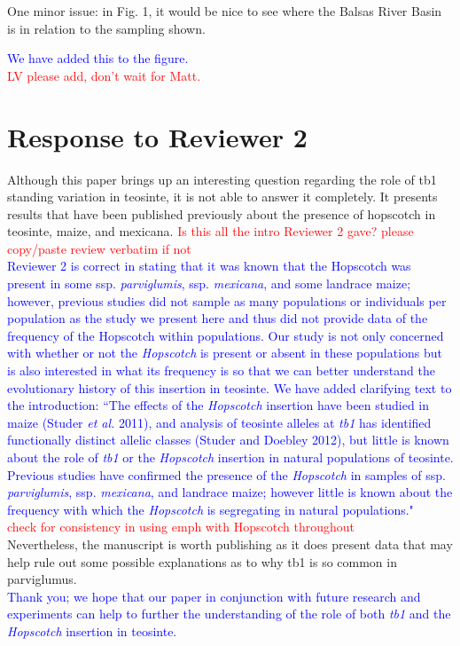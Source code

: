 \documentclass[11pt]{article}
\newcommand{\res}[1]{\noindent \textcolor{blue}{{#1}} \\}
\newcommand{\jri}[1]{\noindent \textcolor{red}{{#1}} \\}
\begin{document}
One minor issue: in Fig. 1, it would be nice to see where the Balsas River Basin is in relation to the sampling shown. 

\res{We have added this to the figure.} \jri{LV please add, don't wait for Matt.}

\section*{Response to Reviewer 2} 
Although this paper brings up an interesting question regarding the role of tb1 standing variation in teosinte, it is not able to answer it completely.  It presents results that have been published previously about the presence of hopscotch in teosinte, maize, and mexicana. \jri{Is this all the intro Reviewer 2 gave? please copy/paste review verbatim if not}

\res{Reviewer 2 is correct in stating that it was known that the Hopscotch was present in some ssp. \emph{parviglumis}, ssp. \emph{mexicana}, and some landrace maize; however, previous studies did not sample as many populations or individuals per population as the study we present here and thus did not provide data of the frequency of the Hopscotch within populations. Our study is not only concerned with whether or not the \emph{Hopscotch} is present or absent in these populations but is also interested in what its frequency is so that we can better understand the evolutionary history of this insertion in teosinte. We have added clarifying text to the introduction: ``The effects of the \emph{Hopscotch} insertion have been studied in maize (Studer \emph{et al.} 2011), and analysis of teosinte alleles at \emph{tb1} has identified functionally distinct allelic classes (Studer and Doebley 2012), but little is known about the role of \emph{tb1} or the \emph{Hopscotch} insertion in natural populations of teosinte. Previous studies have confirmed the presence of the \emph{Hopscotch} in samples of ssp. \emph{parviglumis}, ssp. \emph{mexicana}, and landrace maize; however little is known about the frequency with which the \emph{Hopscotch} is segregating in natural populations."} \jri{check for consistency in using emph with Hopscotch throughout}

Nevertheless, the manuscript is worth publishing as it does present data that may help rule out some possible explanations as to why tb1 is so common in parviglumus.\\

\res{Thank you; we hope that our paper in conjunction with future research and experiments can help to further the understanding of the role of both \emph{tb1} and the \emph{Hopscotch} insertion in teosinte.}
\end{document}
